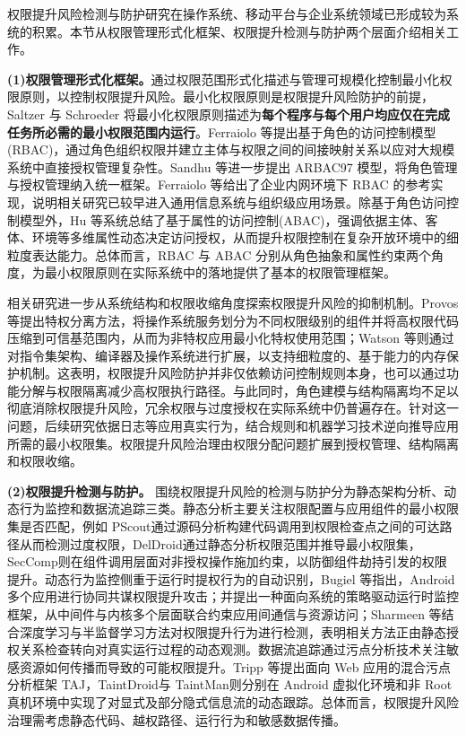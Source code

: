 权限提升风险检测与防护研究在操作系统、移动平台与企业系统领域已形成较为系统的积累。本节从权限管理形式化框架、权限提升检测与防护两个层面介绍相关工作。

\textbf{(1)权限管理形式化框架。}通过权限范围形式化描述与管理可规模化控制最小化权限原则，以控制权限提升风险。最小化权限原则是权限提升风险防护的前提，Saltzer 与 Schroeder 将最小化权限原则描述为\textbf{每个程序与每个用户均应仅在完成任务所必需的最小权限范围内运行}\cite{saltzer1975protection}。Ferraiolo 等\cite{ferraiolo1995role}提出基于角色的访问控制模型(RBAC)，通过角色组织权限并建立主体与权限之间的间接映射关系以应对大规模系统中直接授权管理复杂性。Sandhu 等\cite{sandhu1999arbac97}进一步提出 ARBAC97 模型，将角色管理与授权管理纳入统一框架。Ferraiolo 等\cite{ferraiolo1999intranet}给出了企业内网环境下 RBAC 的参考实现，说明相关研究已较早进入通用信息系统与组织级应用场景。除基于角色访问控制模型外，Hu 等\cite{hu2014guide}系统总结了基于属性的访问控制(ABAC)，强调依据主体、客体、环境等多维属性动态决定访问授权，从而提升权限控制在复杂开放环境中的细粒度表达能力。总体而言，RBAC 与 ABAC 分别从角色抽象和属性约束两个角度，为最小权限原则在实际系统中的落地提供了基本的权限管理框架。

相关研究进一步从系统结构和权限收缩角度探索权限提升风险的抑制机制。Provos 等\cite{provos2003preventing}提出特权分离方法，将操作系统服务划分为不同权限级别的组件并将高权限代码压缩到可信基范围内，从而为非特权应用最小化特权使用范围；Watson 等\cite{watson2015cheri}则通过对指令集架构、编译器及操作系统进行扩展，以支持细粒度的、基于能力的内存保护机制。这表明，权限提升风险防护并非仅依赖访问控制规则本身，也可以通过功能分解与权限隔离减少高权限执行路径。与此同时，角色建模与结构隔离均不足以彻底消除权限提升风险，冗余权限与过度授权在实际系统中仍普遍存在\cite{o1995redundant}。针对这一问题，后续研究依据日志等应用真实行为，结合规则和机器学习技术逆向推导应用所需的最小权限集\cite{molloy2012generative,sanders2018minimizing}。权限提升风险治理由权限分配问题扩展到授权管理、结构隔离和权限收缩。

\textbf{(2)权限提升检测与防护。} 围绕权限提升风险的检测与防护分为静态架构分析、动态行为监控和数据流追踪三类。静态分析主要关注权限配置与应用组件的最小权限集是否匹配，例如 PScout\cite{au2012pscout}通过源码分析构建代码调用到权限检查点之间的可达路径从而检测过度权限，DelDroid\cite{bagheri2019deldroid}通过静态分析权限范围并推导最小权限集，SecComp\cite{wu2016seccomp}则在组件调用层面对非授权操作施加约束，以防御组件劫持引发的权限提升。动态行为监控侧重于运行时提权行为的自动识别，Bugiel 等\cite{Bugiel2012TowardsTP}指出，Android 多个应用进行协同共谋权限提升攻击；并提出一种面向系统的策略驱动运行时监控框架，从中间件与内核多个层面联合约束应用间通信与资源访问；Sharmeen 等\cite{sharmeen2020adaptive}结合深度学习与半监督学习方法对权限提升行为进行检测，表明相关方法正由静态授权关系检查转向对真实运行过程的动态观测。数据流追踪通过污点分析技术关注敏感资源如何传播而导致的可能权限提升。Tripp 等\cite{tripp2009taj}提出面向 Web 应用的混合污点分析框架 TAJ，TaintDroid\cite{enck2014taintdroid}与 TaintMan\cite{you2017taintman}则分别在 Android 虚拟化环境和非 Root 真机环境中实现了对显式及部分隐式信息流的动态跟踪。总体而言，权限提升风险治理需考虑静态代码、越权路径、运行行为和敏感数据传播。

